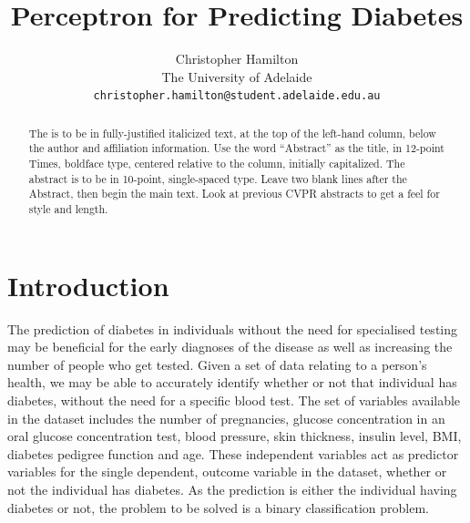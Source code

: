 \documentclass[10pt,twocolumn,a4paper]{article}
\begin{document}
\title{Perceptron for Predicting Diabetes}

\author{Christopher Hamilton\\
The University of Adelaide\\
{\tt\small christopher.hamilton@student.adelaide.edu.au}
}

\maketitle

\begin{abstract}
   The is to be in fully-justified italicized text, at the top
   of the left-hand column, below the author and affiliation
   information. Use the word ``Abstract'' as the title, in 12-point
   Times, boldface type, centered relative to the column, initially
   capitalized. The abstract is to be in 10-point, single-spaced type.
   Leave two blank lines after the Abstract, then begin the main text.
   Look at previous CVPR abstracts to get a feel for style and length.
\end{abstract}

\section{Introduction}

The prediction of diabetes in individuals without the need for specialised
testing may be beneficial for the early diagnoses of the disease as well
as increasing the number of people who get tested. Given a set of data
relating to a person's health, we may be able to accurately identify
whether or not that individual has diabetes, without the need for a
specific blood test. The set of variables available in the dataset includes
the number of pregnancies, glucose concentration in an oral glucose
concentration test, blood pressure, skin thickness, insulin level, BMI,
diabetes pedigree function and age. These independent variables act as
predictor variables for the single dependent, outcome variable in the
dataset, whether or not the individual has diabetes. As the prediction
is either the individual having diabetes or not, the problem to be solved
is a binary classification problem.
\end{document}
